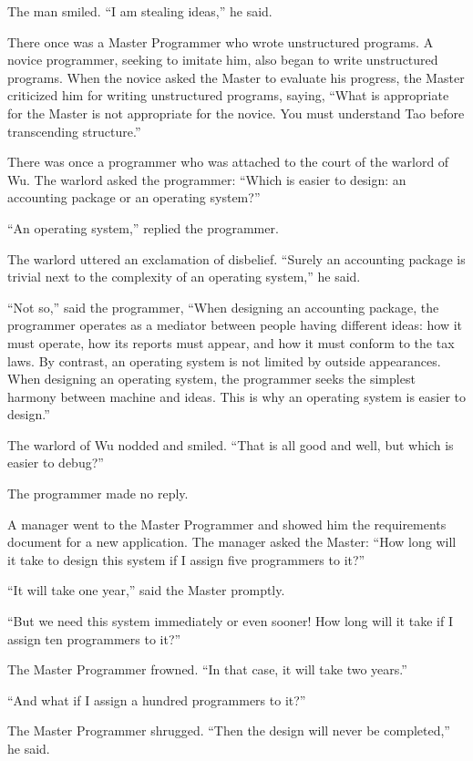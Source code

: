 The man smiled. ``I am stealing ideas,'' he said.

There once was a Master Programmer who wrote unstructured programs. A novice programmer, seeking to imitate him, also began to write unstructured programs. When the novice asked the Master to evaluate his progress, the Master criticized him for writing unstructured programs, saying, ``What is appropriate for the Master is not appropriate for the novice. You must understand Tao before transcending structure.''

There was once a programmer who was attached to the court of the warlord of Wu. The warlord asked the programmer: ``Which is easier to design: an accounting package or an operating system?''

``An operating system,'' replied the programmer.

The warlord uttered an exclamation of disbelief. ``Surely an accounting package is trivial next to the complexity of an operating system,'' he said.

``Not so,'' said the programmer, ``When designing an accounting package, the programmer operates as a mediator between people having different ideas: how it must operate, how its reports must appear, and how it must conform to the tax laws. By contrast, an operating system is not limited by outside appearances. When designing an operating system, the programmer seeks the simplest harmony between machine and ideas. This is why an operating system is easier to design.''

The warlord of Wu nodded and smiled. ``That is all good and well, but which is easier to debug?''

The programmer made no reply.

A manager went to the Master Programmer and showed him the requirements document for a new application. The manager asked the Master: ``How long will it take to design this system if I assign five programmers to it?''

``It will take one year,'' said the Master promptly.

``But we need this system immediately or even sooner! How long will it take if I assign ten programmers to it?''

The Master Programmer frowned. ``In that case, it will take two years.''

``And what if I assign a hundred programmers to it?''

The Master Programmer shrugged. ``Then the design will never be completed,'' he said.


